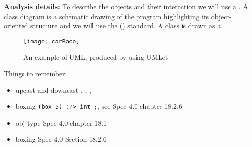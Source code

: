 \textbf{Analysis details:} To describe the objects and their interaction we will use a . A class diagram is a schematic drawing of the program highlighting its object-oriented structure and we will use the  () \cite{uml2} standard. A class is drawn as a 

\begin{figure}
  \centering
  \texttt{[image: carRace]}
  \caption{An example of UML, produced by using UMLet \cite{umlet}}
  \label{uml}
\end{figure}

Things to remember: 
\begin{itemize}
\item upcast and downcast , \lexeme{:>},
  , 
\item boxing \lstinline|(box 5) :?> int;;|, see Spec-4.0 chapter
  18.2.6.
\item obj type Spec-4.0 chapter 18.1
\item boxing Spec-4.0 Section 18.2.6
\end{itemize}

